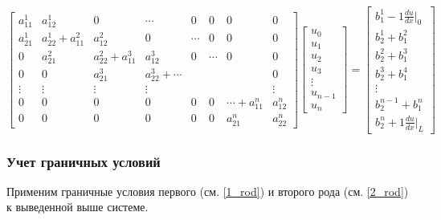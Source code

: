 $$ \begin{bmatrix}
a_{11}^1     &   a_{12}^1         &   0 & \cdots & 0 & 0 & 0  & 0\\
a_{21}^1     &    a_{22}^1+a_{11}^2 & a_{12}^2  & 0 & \cdots & 0 & 0  & 0\\
0     &    a_{21}^2 & a_{22}^2+a_{11}^3  &  a_{12}^3  & 0 & \cdots & 0  & 0\\
0     &    0  & a_{21}^3  & a_{22}^3+ \cdots  &  & &   & 0\\
\vdots & \vdots & \vdots & \vdots &  &  &   & \vdots\\
0 & 0 & 0 & 0 &  0 & 0 & \cdots+a_{11}^n  & a_{12}^n\\
0 & 0 & 0 & 0 &  0 & 0 & a_{21}^n  & a_{22}^n
\end{bmatrix}
\begin{bmatrix}
u_0 \\
u_1 \\
u_2\\
u_3\\
\vdots\\
u_{n-1}\\
u_n
\end{bmatrix} =
\begin{bmatrix}
b_1^1   -1  \frac{du}{dx}|_0 \\
b_2^1+b_1^2\\
b_2^2+b_1^3\\
b_2^3+b_1^4\\
\vdots\\
b_2^{n-1}+b_1^n\\
b_2^n   +1  \frac{du}{dx}|_L
\end{bmatrix}
$$

\subsubsection{Учет граничных условий}

Применим граничные условия первого (см. \ref{1_rod}) и второго рода (см. \ref{2_rod}) к выведенной выше системе.

